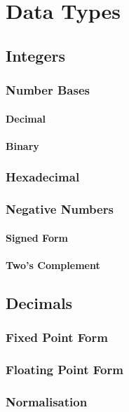 \chapter{Data Types}
	
	\section{Integers}
		\subsection{Number Bases}
			\subsubsection{Decimal}
			\subsubsection{Binary}
			\subsection{Hexadecimal}
	
		\subsection{Negative Numbers}
			\subsubsection{Signed Form}
			
			\subsubsection{Two's Complement}
		
	\section{Decimals}
		\subsection{Fixed Point Form}
		
		\subsection{Floating Point Form}
		
		\subsection{Normalisation}
		

